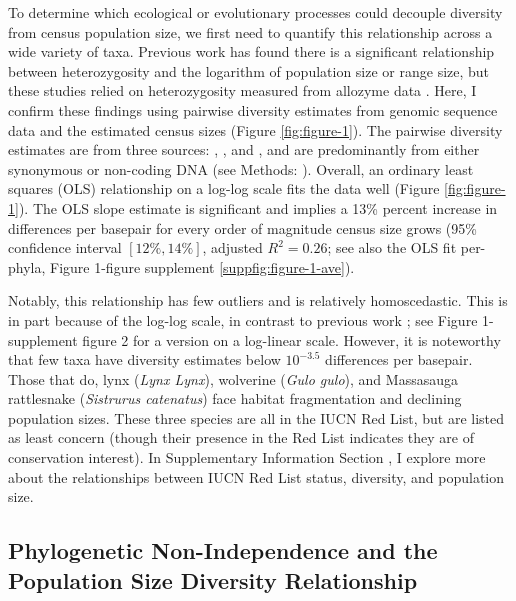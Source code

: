 \documentclass[11pt]{article}
\newcommand{\Newnameref}[1]{\textit{\nameref{#1}}}
\begin{document}
To determine which ecological or evolutionary processes could decouple
diversity from census population size, we first need to quantify this
relationship across a wide variety of taxa. Previous work has found there is a
significant relationship between heterozygosity and the logarithm of population
size or range size, but these studies relied on heterozygosity measured from
allozyme data
\parencite{Soule1976-he,Frankham1996-yb,Nei1984-zi,Leffler2012-zj}. Here, I
confirm these findings using pairwise diversity estimates from genomic sequence
data and the estimated census sizes (Figure \ref{fig:figure-1}). The pairwise
diversity estimates are from three sources: \textcite{Leffler2012-zj},
\textcite{Corbett-Detig2015-gt}, and \textcite{Romiguier2014-bp}, and are
predominantly from either synonymous or non-coding DNA (see Methods:
\Newnameref{sec:methods-diversity}). Overall, an ordinary least squares (OLS)
relationship on a log-log scale fits the data well (Figure \ref{fig:figure-1}).
The OLS slope estimate is significant and implies a 13\% percent increase in
differences per basepair for every order of magnitude census size grows (95\%
confidence interval $[12\%, 14\%]$, adjusted $R^2 = 0.26$; see also the OLS fit
per-phyla, Figure 1-figure supplement \ref{suppfig:figure-1-ave}). 

Notably, this relationship has few outliers and is relatively homoscedastic.
This is in part because of the log-log scale, in contrast to previous work
\parencite{Nei1984-zi,Soule1976-he}; see Figure 1-supplement figure 2 for a
version on a log-linear scale. However, it is noteworthy that few taxa have
diversity estimates below $10^{-3.5}$ differences per basepair. Those that do,
lynx (\emph{Lynx Lynx}), wolverine (\emph{Gulo gulo}), and Massasauga
rattlesnake (\emph{Sistrurus catenatus}) face habitat fragmentation and
declining population sizes. These three species are all in the IUCN Red List,
but are listed as least concern (though their presence in the Red List
indicates they are of conservation interest). In Supplementary Information
Section \Newnameref{supinfo:div-iucn}, I explore more about the relationships
between IUCN Red List status, diversity, and population size.

\subsection*{Phylogenetic Non-Independence and the Population Size Diversity Relationship}
\end{document}
